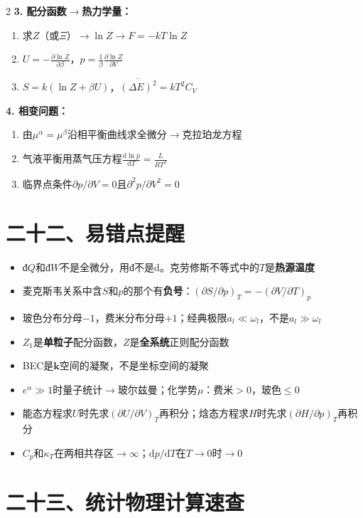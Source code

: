 \documentclass[10pt,a4paper,fontset=mac]{ctexart}
\newcommand{\kk}{\mathbf{k}}
\newcommand{\dd}{\mathrm{d}}
\newcommand{\đ}{\mathrm{đ}}
\begin{document}
\begin{multicols}{2}
\textbf{3. 配分函数$\to$热力学量：}
\begin{enumerate}
\item 求$Z$（或$\Xi$）$\to\ln Z\to F=-kT\ln Z$
\item $U=-\frac{\partial\ln Z}{\partial\beta}$，$p=\frac{1}{\beta}\frac{\partial\ln Z}{\partial V}$
\item $S=k(\ln Z+\beta U)$，$\overline{(\Delta E)^2}=kT^2C_V$
\end{enumerate}

\textbf{4. 相变问题：}
\begin{enumerate}
\item 由$\mu^\alpha=\mu^\beta$沿相平衡曲线求全微分$\to$克拉珀龙方程
\item 气液平衡用蒸气压方程$\frac{\dd\ln p}{\dd T}=\frac{L}{RT^2}$
\item 临界点条件$\partial p/\partial V=0$且$\partial^2p/\partial V^2=0$
\end{enumerate}

\section*{二十二、易错点提醒}

\begin{itemize}
\item $\đ Q$和$\đ W$不是全微分，用$\đ$不是$\dd$。克劳修斯不等式中的$T$是\textbf{热源温度}
\item 麦克斯韦关系中含$S$和$p$的那个有\textbf{负号}：$(\partial S/\partial p)_T=-(\partial V/\partial T)_p$
\item 玻色分布分母$-1$，费米分布分母$+1$；经典极限$a_l\ll\omega_l$，不是$a_l\gg\omega_l$
\item $Z_1$是\textbf{单粒子}配分函数，$Z$是\textbf{全系统}正则配分函数
\item BEC是$\kk$空间的凝聚，不是坐标空间的凝聚
\item $e^\alpha\gg1$时量子统计$\to$玻尔兹曼；化学势$\mu$：费米$>0$，玻色$\le0$
\item 能态方程求$U$时先求$(\partial U/\partial V)_T$再积分；焓态方程求$H$时先求$(\partial H/\partial p)_T$再积分
\item $C_p$和$\kappa_T$在两相共存区$\to\infty$；$\dd p/\dd T$在$T\to0$时$\to0$
\end{itemize}

\section*{二十三、统计物理计算速查}


\end{multicols}
\end{document}
